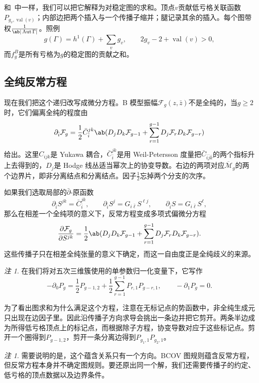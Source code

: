 \documentclass{amsart}
\theoremstyle{definition}
\theoremstyle{remark}
\newtheorem{rmk}[thm]{注}
\theoremstyle{plain}
\theoremstyle{definition}
\theoremstyle{remark}
\newcommand{\Mbar}{\overline{\mathcal{M}}}
\newcommand{\mc}[1]{\mathcal{#1}}
\newcommand{\on}[1]{\operatorname{#1}}
\newcommand{\1}{\mathbf{1}}
\newcommand{\2}{\mathbf{2}}
\newcommand{\3}{\mathbf{3}}
\DeclareMathOperator{\Aut}{Aut}
\begin{document}
和~中一样，我们可以把它解释为对稳定图的求和。顶点\(v\)贡献低亏格关联函数\(P_{g_v, \on{val}(v)}\)；内部边把两个插入与一个传播子缩并；腿记录其余的插入。每个图带权\(\frac{1}{\ab|\Aut \Gamma|}\)。照例
\[ g(\Gamma) = h^1(\Gamma) + \sum_v g_v, \qquad 2g_v - 2 + \on{val}(v) > 0, \]
而\(f_g^B\)是所有亏格为\(g\)的稳定图的贡献之和。

\subsection{全纯反常方程}%
\label{sub:The holomorphic anomaly equation}

现在我们把这个递归改写成微分方程。B 模型振幅\(\mc{F}_g(z,\bar{z})\)不是全纯的，当\(g \geq 2\)时，它们偏离全纯的程度由
\[ \partial_{\bar{i}} \mc{F}_g = \frac{1}{2}\bar{C}_{\bar{i}}^{jk}\ab( D_j D_k \mc{F}_{g-1} + \sum_{r=1}^{g-1} D_j \mc{F}_r D_k \mc{F}_{g-r} ) \]
给出。这里\(C_{ijk}\)是 Yukawa 耦合，\(\bar{C}_{\bar{i}}^{jk}\)是用 Weil-Petersson 度量把\(\bar{C}_{\bar{i}\bar{j}\bar{k}}\)的两个指标升上去得到的，\(D_j\)是 Hodge 线丛适当幂次上的协变导数。右边的两项对应\(\Mbar_g\)的两个边界片，即非分离结点和分离结点。因子\(\frac{1}{2}\)忘掉两个分支的次序。

如果我们选取局部的\(\bar{\partial}\)-原函数
\[ \partial_{\bar{i}}S^{jk} = \bar{C}_{\bar{i}}^{jk}, \qquad \partial_{\bar{i}}S^j = G_{i\bar{\ell}}S^{\ell j}, \qquad \partial_{\bar{i}}S = G_{i\bar{\ell}}S^{\ell}, \]
那么在相差一个全纯项的意义下，反常方程变成多项式偏微分方程
\[ \pdv{\mc{F}_g}{S^{jk}} = \frac{1}{2}\ab( D_jD_k \mc{F}_{g-1} + \sum_{r=1}^{g-1} D_j \mc{F}_r D_k \mc{F}_{g-r} ). \]
这些传播子只在相差全纯张量的意义下确定，而这一自由度正是全纯歧义的来源。

\begin{rmk}
    在我们将对五次三维簇使用的单参数归一化变量下，它写作
    \[ -\partial_0 P_g = \frac{1}{2}P_{g-1,2} + \frac{1}{2}\sum_{r=1}^{g-1}P_{r,1}P_{g-r,1}, \qquad -\partial_1 P_g = 0. \]
\end{rmk}

为了看出图求和为什么满足这个方程，注意在无标记点的势函数中，非全纯生成元只出现在边因子里。因此沿传播子方向求导会挑出一条边并把它剪开。两条半边成为所得低亏格顶点上的标记点，而根据除子方程，协变导数对应于这些标记点。剪开一个圈得到\(P_{g-1,2}\)，剪开一条分离边得到\(P_{g_1,1}P_{g_2,1}\)。

\begin{rmk}
    需要说明的是，这个蕴含关系只有一个方向。BCOV 图规则蕴含反常方程，但反常方程本身并不确定图规则。要还原出同一个解，我们还需要传播子的约定、低亏格的顶点数据以及边界条件。
\end{rmk}
\end{document}
